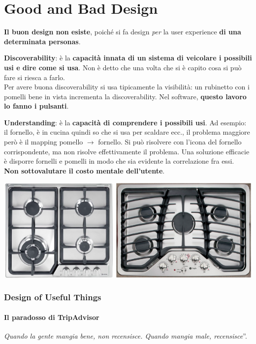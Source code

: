 \documentclass[10pt]{article}
\begin{document}
\section{Good and Bad Design}
\textbf{Il buon design non esiste}, poiché si fa design \textit{per} la user experience \textbf{di una determinata personas}.
\begin{list}{}{Le due caratteristiche più importanti su cui misurare il buon design sono:}
\item \textbf{Discoverability}: è la \textbf{capacità innata di un sistema di veicolare i possibili usi e dire come si usa}. Non è detto che una volta che si è capito cosa si può fare si riesca a farlo.\\
Per avere buona discoverability si usa tipicamente la visibilità: un rubinetto con i pomelli bene in vista incrementa la discoverability. Nel software, \textbf{questo lavoro lo fanno i pulsanti}.
\item \textbf{Understanding}: è la \textbf{capacità di comprendere i possibili usi}. Ad esempio: il fornello, è in cucina quindi so che si usa per scaldare ecc., il problema maggiore però è il mapping pomello $\rightarrow$ fornello. Si può risolvere con l'icona del fornello corrispondente, ma non risolve effettivamente il problema. Una soluzione efficacie è disporre fornelli e pomelli in modo che sia evidente la correlazione fra essi.\\
\textbf{Non sottovalutare il costo mentale dell'utente}.
\end{list}
\begin{center}
\includegraphics[scale=0.5]{fornelli.png}
\end{center}

\subsubsection{Design of Useful Things}
\paragraph{Il paradosso di TripAdvisor} \quotedblbase \emph{Quando la gente mangia bene, non recensisce. Quando mangia male, recensisce}\textquotedblright.
\end{document}
